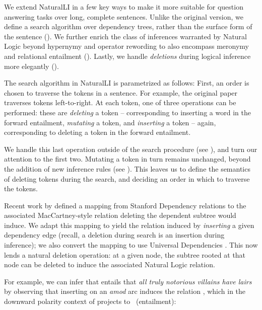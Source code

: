 We extend NaturalLI in a few key ways to make it more suitable for question
  answering tasks over long, complete sentences.
Unlike the original version, we define a search algorithm over dependency
  trees, rather than the surface form of the sentence ().
We further enrich the class of inferences warranted by Natural Logic beyond
  hypernymy and operator rewording to also encompass meronymy and
  relational entailment ().
Lastly, we handle \textit{deletions} during logical inference more elegantly
  ().

%
%
The search algorithm in NaturalLI is parametrized as follows:
First, an order is chosen to traverse the tokens in a sentence.
For example, the original paper traverses tokens left-to-right.
At each token, one of three operations can be performed:
  these are \textit{deleting} a token
  -- corresponding to inserting a word in the forward entailment,
  \textit{mutating} a token, and \textit{inserting} a token -- again, corresponding
  to deleting a token in the forward entailment.

We handle this last operation outside of the search procedure (see ),
  and turn our attention to the first two.
Mutating a token in turn remains unchanged, beyond the addition of new inference rules
  (see ).
This leaves us to define the semantics of deleting tokens during the search, and
  deciding an order in which to traverse the tokens.

Recent work by  defined a mapping from Stanford
  Dependency relations to the associated MacCartney-style relation deleting the
  dependent subtree would induce.
We adapt this mapping to yield the relation induced by \textit{inserting} a
  given dependency edge (recall, a deletion during search is an insertion during
  inference); we also convert the mapping to use Universal Dependencies
  \cite{key:stanford-ud}.
This now lends a natural deletion operation: at a given node, the subtree rooted
  at that node can be deleted to induce the associated Natural Logic relation.

For example, we can infer that  entails that
  \textit{all truly notorious villains have lairs} by observing that inserting
  on an \textit{amod} arc induces the relation \reverse, which in the downward
  polarity context of \textit{} projects to \forward\ (entailment):

